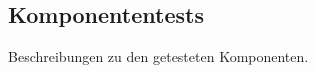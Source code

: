 %



\newpage



\subsection*{Komponententests}
\label{Abschnitt:Tests:Protokoll:Komponenten}

Beschreibungen zu den getesteten Komponenten.







